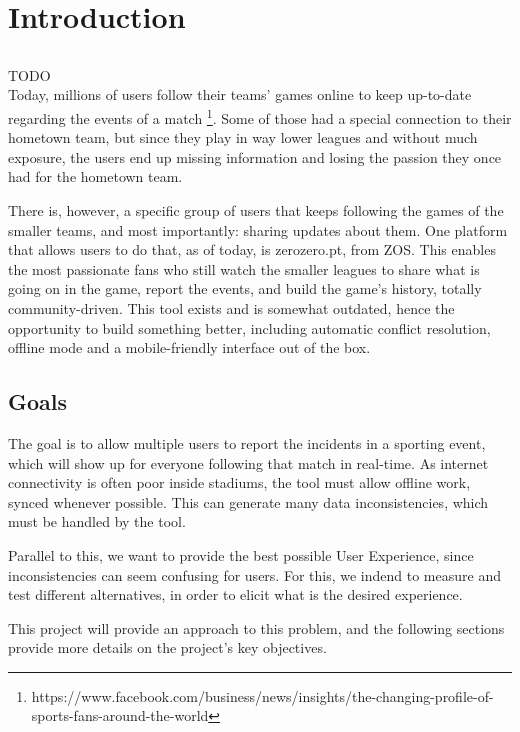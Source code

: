 \chapter{Introduction} \label{chap:intro}

\section*{}

{\Huge TODO} \\


Today, millions of users follow their teams' games online to keep up-to-date regarding the events of a match \footnote{https://www.facebook.com/business/news/insights/the-changing-profile-of-sports-fans-around-the-world}. Some of those had a special connection to their hometown team, but since they play in way lower leagues and without much exposure, the users end up missing information and losing the passion they once had for the hometown team.

There is, however,  a specific group of users that keeps following the games of the smaller teams, and most importantly: sharing updates about them. One platform that allows users to do that, as of today, is zerozero.pt, from ZOS. This enables the most passionate fans who still watch the smaller leagues to share what is going on in the game, report the events, and build the game's history, totally community-driven. This tool exists and is somewhat outdated, hence the opportunity to build something better, including automatic conflict resolution, offline mode and a mobile-friendly interface out of the box.

\section{Goals}
The goal is to allow multiple users to report the incidents in a sporting event, which will show up for everyone following that match in real-time. As internet connectivity is often poor inside stadiums, the tool must allow offline work, synced whenever possible. This can generate many data inconsistencies, which must be handled by the tool.

Parallel to this, we want to provide the best possible User Experience, since inconsistencies can seem confusing for users. For this, we indend to measure and test different alternatives, in order to elicit what is the desired experience. 

This project will provide an approach to this problem, and the following sections provide more details on the project's key objectives.

